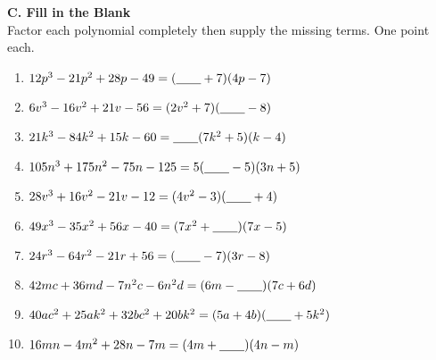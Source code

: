     \vspace*{1.3ex}
    
    \noindent \textbf{C. Fill in the Blank} \\
    
    Factor each polynomial completely then supply the missing terms. One point each.
    
    \begin{enumerate}
    		\item $ 12p^3 - 21p^2 + 28p - 49 = (\underline{\hspace{2em}} + 7)(4p - 7) $
    		\item $ 6v^3  - 16v^2 + 21v - 56 = (2v^2 + 7)(\underline{\hspace{2em}} - 8) $
    		\item $ 21k^3 - 84k^2 + 15k - 60 = \underline{\hspace{2em}} (7k^2 + 5)(k - 4) $
    		\item $ 105n^3 + 175n^2 - 75n - 125 = 5(\underline{\hspace{2em}} - 5)(3n + 5) $
    		\item $ 28v^3 + 16v^2 - 21v - 12 = (4v^2 - 3) (\underline{\hspace{2em}} + 4) $
    		\item $ 49x^3 - 35x^2 + 56x - 40 = (7x^2 + \underline{\hspace{2em}}) (7x - 5) $
    		\item $ 24r^3 - 64r^2 - 21r + 56 = (\underline{\hspace{2em}} - 7) (3r - 8) $
    		\item $ 42mc + 36md - 7n^2c - 6n^2d = (6m - \underline{\hspace{2em}}) (7c + 6d) $
    		\item $ 40ac^2 + 25ak^2 + 32bc^2 + 20bk^2 = (5a + 4b) (\underline{\hspace{2em}} + 5k^2) $
    		\item $ 16mn - 4m^2 + 28n - 7m = (4m + \underline{\hspace{2em}}) (4n - m) $
    \end{enumerate}

    \newpage
    
